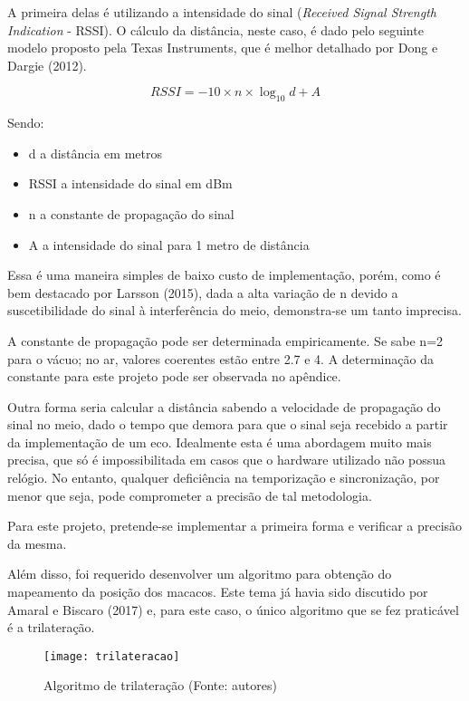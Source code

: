 A primeira delas é utilizando a intensidade do sinal (\textit{Received Signal Strength Indication} - RSSI). O cálculo da distância, neste caso, é dado pelo seguinte modelo proposto pela Texas Instruments, que é melhor detalhado por Dong e Dargie (2012).

\begin{equation}
RSSI = -10 \times n \times \log_{10} d + A
\end{equation}

Sendo:
\begin{itemize}
\item d a distância em metros
\item RSSI a intensidade do sinal em dBm
\item n a constante de propagação do sinal
\item A a intensidade do sinal para 1 metro de distância
\end{itemize}

Essa é uma maneira simples de baixo custo de implementação, porém, como é bem destacado por Larsson (2015), dada a alta variação de n devido a suscetibilidade do sinal à interferência do meio, demonstra-se um tanto imprecisa.

A constante de propagação pode ser determinada empiricamente. Se sabe n=2 para o vácuo; no ar, valores coerentes estão entre 2.7 e 4. A determinação da constante para este projeto pode ser observada no apêndice.

Outra forma seria calcular a distância sabendo a velocidade de propagação do sinal no meio, dado o tempo que demora para que o sinal seja recebido a partir da implementação de um eco. Idealmente esta é uma abordagem muito mais precisa, que só é impossibilitada em casos que o hardware utilizado não possua relógio. No entanto, qualquer deficiência na temporização e sincronização, por menor que seja, pode comprometer a precisão de tal metodologia.

Para este projeto, pretende-se implementar a primeira forma e verificar a precisão da mesma.

Além disso, foi requerido desenvolver um algoritmo para obtenção do mapeamento da posição dos macacos. Este tema já havia sido discutido por Amaral e Biscaro (2017) e, para este caso, o único algoritmo que se fez praticável é a trilateração.

\begin{figure}[ht]
  \centering
    \texttt{[image: trilateracao]}
  \caption{Algoritmo de trilateração (Fonte: autores)}
\end{figure}
\FloatBarrier

